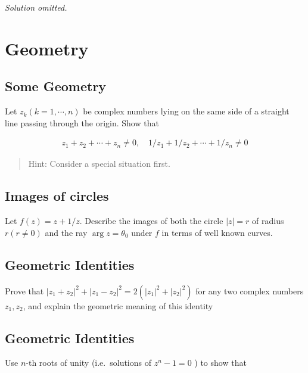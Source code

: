 \emph{Solution omitted.}

\hypertarget{geometry}{%
\section{Geometry}\label{geometry}}

\hypertarget{some-geometry}{%
\subsection{Some Geometry}\label{some-geometry}}

Let \(z_{k}(k=1, \cdots, n)\) be complex numbers lying on the same side
of a straight line passing through the origin. Show that

\begin{align*}
z_{1}+z_{2}+\cdots+z_{n} \neq 0, \quad 1 / z_{1}+1 / z_{2}+\cdots+1 / z_{n} \neq 0
\end{align*}

\begin{quote}
Hint: Consider a special situation first.
\end{quote}

\hypertarget{images-of-circles}{%
\subsection{Images of circles}\label{images-of-circles}}

Let \(f(z)=z+1 / z\). Describe the images of both the circle \(|z|=r\)
of radius \(r(r \neq 0)\) and the ray \(\arg z=\theta_{0}\) under \(f\)
in terms of well known curves.

\hypertarget{geometric-identities}{%
\subsection{Geometric Identities}\label{geometric-identities}}

Prove that
\(\left|z_{1}+z_{2}\right|^{2}+\left|z_{1}-z_{2}\right|^{2}=2\left(\left|z_{1}\right|^{2}+\left|z_{2}\right|^{2}\right)\)
for any two complex numbers \(z_{1}, z_{2}\), and explain the geometric
meaning of this identity

\hypertarget{geometric-identities-1}{%
\subsection{Geometric Identities}\label{geometric-identities-1}}

Use \(n\)-th roots of unity (i.e.~solutions of \(z^{n}-1=0\) ) to show
that

